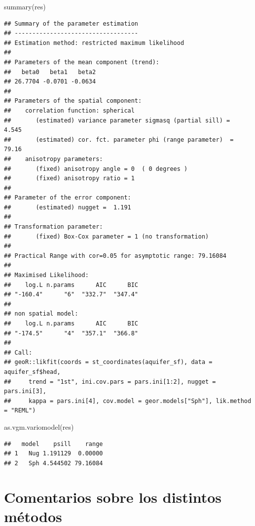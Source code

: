 \documentclass[
  spanish,
]{book}
\newenvironment{Shaded}{\begin{snugshade}}{\end{snugshade}}
\newcommand{\FunctionTok}[1]{\textcolor[rgb]{0.00,0.00,0.00}{#1}}
\newcommand{\NormalTok}[1]{#1}
\theoremstyle{break}
\theoremstyle{definition}
\theoremstyle{definition}
\theoremstyle{definition}
\theoremstyle{definition}
\theoremstyle{remark}
\begin{document}
\begin{Shaded}
\begin{Highlighting}[]
\FunctionTok{summary}\NormalTok{(res)}
\end{Highlighting}
\end{Shaded}

\begin{verbatim}
## Summary of the parameter estimation
## -----------------------------------
## Estimation method: restricted maximum likelihood 
## 
## Parameters of the mean component (trend):
##   beta0   beta1   beta2 
## 26.7704 -0.0701 -0.0634 
## 
## Parameters of the spatial component:
##    correlation function: spherical
##       (estimated) variance parameter sigmasq (partial sill) =  4.545
##       (estimated) cor. fct. parameter phi (range parameter)  =  79.16
##    anisotropy parameters:
##       (fixed) anisotropy angle = 0  ( 0 degrees )
##       (fixed) anisotropy ratio = 1
## 
## Parameter of the error component:
##       (estimated) nugget =  1.191
## 
## Transformation parameter:
##       (fixed) Box-Cox parameter = 1 (no transformation)
## 
## Practical Range with cor=0.05 for asymptotic range: 79.16084
## 
## Maximised Likelihood:
##    log.L n.params      AIC      BIC 
## "-160.4"      "6"  "332.7"  "347.4" 
## 
## non spatial model:
##    log.L n.params      AIC      BIC 
## "-174.5"      "4"  "357.1"  "366.8" 
## 
## Call:
## geoR::likfit(coords = st_coordinates(aquifer_sf), data = aquifer_sf$head, 
##     trend = "1st", ini.cov.pars = pars.ini[1:2], nugget = pars.ini[3], 
##     kappa = pars.ini[4], cov.model = geor.models["Sph"], lik.method = "REML")
\end{verbatim}

\begin{Shaded}
\begin{Highlighting}[]
\FunctionTok{as.vgm.variomodel}\NormalTok{(res)}
\end{Highlighting}
\end{Shaded}

\begin{verbatim}
##   model    psill    range
## 1   Nug 1.191129  0.00000
## 2   Sph 4.544502 79.16084
\end{verbatim}

\hypertarget{comentarios-sobre-los-distintos-muxe9todos}{%
\section{Comentarios sobre los distintos métodos}\label{comentarios-sobre-los-distintos-muxe9todos}}
\end{document}
